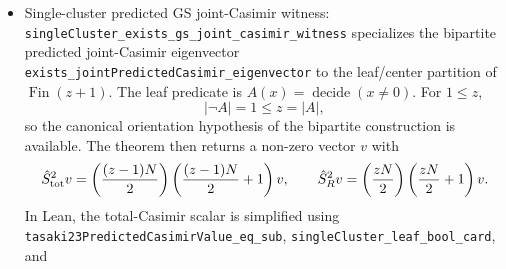 \documentclass[a4paper,11pt]{article}
\begin{document}
\begin{itemize}
        \[
          M=\operatorname{magEigenvalueS}(\sigma)
           =m_{\max}-\operatorname{magSumS}(\sigma),
          \qquad
          m_{\max}=|\operatorname{Fin}(z+1)|N/2 .
        \]
        The coupled leaf-sector theorem uses the opposite indexing convention
        \(k-m_{\max}\).  Lean sets
        \[
          k=|\operatorname{Fin}(z+1)|N-\operatorname{magSumS}(\sigma)
        \]
        and rewrites
        \[
          M=k-m_{\max}.
        \]
        Therefore the same vector \(w\) belongs to the magnetization sector
        required by
        \texttt{singleClusterGSEnergyS\_re\_le\_casimir\_energy\_of\_coupled\_leaf\_sector}.
        For \(1\le z\), that theorem gives
        \[
          \operatorname{Re}E_{\rm GS}
          \le
          \operatorname{Re}\left(
            \frac{\alpha-N(N+2)/4-\beta}{2}\right).
        \]
        Feeding this callback into the PR~\#4045 witness bridge yields
        \texttt{singleClusterGSEnergyS\_re\_le\_hermitianMinEigenvalue\_of\_extracted\_coupled\_leaf\_sector}.
        The companion declarations
        \texttt{singleClusterHamiltonianS\_minEigenvalue\_eq\_gs\_of\_gs\_sector\_and\_extracted\_coupled\_leaf\_sector}
        and
        \texttt{singleClusterHamiltonianS\_minEigenvalue\_eq\_gs\_of\_exists\_gs\_sector\_and\_extracted\_coupled}
        package the corresponding conditional equality endpoints under the
        explicit hypotheses \(1\le z\) and
        \texttt{[IsAlgClosed \(\mathbb C\)]}
        ($\gamma$-5 step 337).
  \item Single-cluster predicted GS joint-Casimir witness:
        \texttt{singleCluster\_exists\_gs\_joint\_casimir\_witness}
        specializes the bipartite predicted joint-Casimir eigenvector
        \texttt{exists\_jointPredictedCasimir\_eigenvector} to the leaf/center
        partition of \(\operatorname{Fin}(z+1)\).  The leaf predicate is
        \(A(x)=\operatorname{decide}(x\ne0)\).  For \(1\le z\),
        \[
          |\neg A|=1\le z=|A|,
        \]
        so the canonical orientation hypothesis of the bipartite construction
        is available.  The theorem then returns a non-zero vector \(v\) with
        \[
          \hat S_{\rm tot}^2v
            =
            \left(\frac{(z-1)N}{2}\right)
            \left(\frac{(z-1)N}{2}+1\right)v,
          \qquad
          \hat S_R^2v
            =
            \left(\frac{zN}{2}\right)
            \left(\frac{zN}{2}+1\right)v.
        \]
        In Lean, the total-Casimir scalar is simplified using
        \texttt{tasaki23PredictedCasimirValue\_eq\_sub},
        \texttt{singleCluster\_leaf\_bool\_card}, and

\end{itemize}
\end{document}
